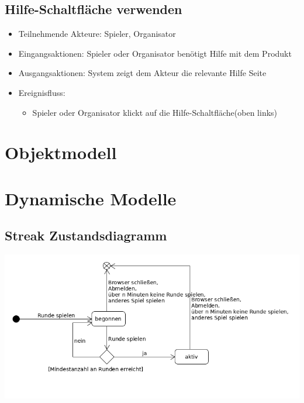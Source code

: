 \documentclass[a4paper]{scrreprt}
\begin{document}
       \subsection{Hilfe-Schaltfläche verwenden}
    \begin{itemize}
        \item Teilnehmende Akteure: \Gls{Spieler}, \Gls{Organisator}
        \item Eingangsaktionen: \Gls{Spieler} oder \Gls{Organisator} benötigt Hilfe mit dem Produkt
        \item Ausgangsaktionen: System zeigt dem Akteur die relevante Hilfe Seite
        \item Ereignisfluss:
            \begin{itemize}
                \item \Gls{Spieler} oder \Gls{Organisator} klickt auf die Hilfe-Schaltfläche(oben links)
            \end{itemize}
    \end{itemize}


        \section{Objektmodell}

    \section{Dynamische Modelle}
    \subsection{Streak Zustandsdiagramm}
    \label{fig:Streak_State}
    \includegraphics[width=\textwidth]{uml/export/Streak_Zustand.png}
\end{document}
